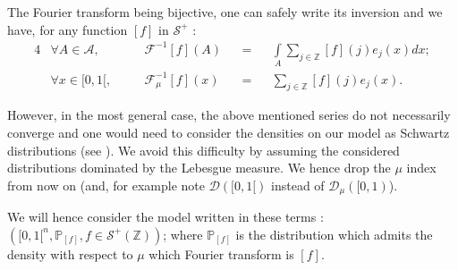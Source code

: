 The Fourier transform being bijective, one can safely write its inversion and we have, for any function $[f]$ in $\mathcal{S}^{+}$ :
\begin{alignat*}{4}
&\forall A \in \mathcal{A},&& \quad \mathcal{F}^{-1}[f](A) &&=&& \int\limits_{A}\sum\limits_{j \in \mathds{Z}} [f](j)e_{j}(x)dx;\\
&\forall x \in [0, 1[,&& \quad \mathcal{F}_{\mu}^{-1}[f](x) &&=&& \sum\limits_{j \in \mathds{Z}} [f](j)e_{j}(x).
\end{alignat*}

However, in the most general case, the above mentioned series do not necessarily converge and one would need to consider the densities on our model as Schwartz distributions (see ).
We avoid this difficulty by assuming the considered distributions dominated by the Lebesgue measure.
We hence drop the $\mu$ index from now on (and, for example note $\mathcal{D}([0,1[)$ instead of $\mathcal{D}_{\mu}([0, 1)$).

We will hence consider the model written in these terms : $\left([0, 1[^{n}, \mathds{P}_{[f]}, f \in \mathcal{S}^{+}(\mathds{Z})\right)$; where $\mathds{P}_{[f]}$ is the distribution which admits the density with respect to $\mu$ which Fourier transform is $[f]$.

